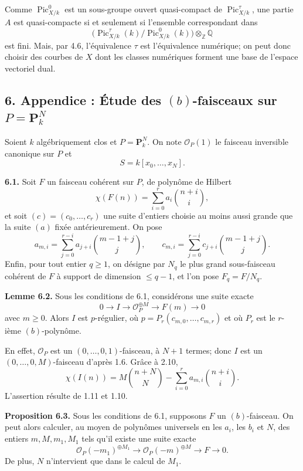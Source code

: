\documentclass[11pt]{article}
\providecommand{\Pic}{\operatorname{Pic}}
\providecommand{\Z}{\mathbb Z}
\providecommand{\Q}{\mathbb Q}
\begin{document}
Comme $\Pic^0_{X/k}$ est un sous-groupe ouvert quasi-compact de $\Pic^\tau_{X/k}$, une partie $A$ est quasi-compacte si et seulement si l'ensemble correspondant dans
\[
   \bigl(\Pic^\tau_{X/k}(k)/\Pic^0_{X/k}(k)\bigr)\otimes_{\Z}\Q
\]
est fini. Mais, par 4.6, l'\'equivalence $\tau$ est l'\'equivalence num\'erique; on peut donc choisir des courbes de $X$ dont les classes num\'eriques forment une base de l'espace vectoriel dual.

\subsection*{6. Appendice : Étude des $(b)$-faisceaux sur $P=\mathbf P^N_k$}

Soient $k$ alg\'ebriquement clos et $P=\mathbf P^N_k$. On note $\mathcal O_P(1)$ le faisceau inversible canonique sur $P$ et
\[
   S=k[x_0,\ldots,x_N].
\]

\textbf{6.1.} Soit $F$ un faisceau coh\'erent sur $P$, de polyn\^ome de Hilbert
\[
   \chi(F(n))=\sum_{i=0}^{r} a_i {n+i\choose i},
\]
et soit $(c)=(c_0,\ldots,c_r)$ une suite d'entiers choisie au moins aussi grande que la suite $(a)$ fix\'ee ant\'erieurement. On pose
\[
   a_{m,i}=\sum_{j=0}^{r-i}a_{j+i}{m-1+j\choose j},
   \qquad
   c_{m,i}=\sum_{j=0}^{r-i}c_{j+i}{m-1+j\choose j}.
\]
Enfin, pour tout entier $q\ge1$, on d\'esigne par $N_q$ le plus grand sous-faisceau coh\'erent de $F$ \`a support de dimension $\le q-1$, et l'on pose $F_q=F/N_q$.

\textbf{Lemme 6.2.} Sous les conditions de 6.1, consid\'erons une suite exacte
\[
   0\longrightarrow I\longrightarrow \mathcal O_P^{\oplus M}\longrightarrow F(m)\longrightarrow0
\]
avec $m\ge0$. Alors $I$ est $p$-r\'egulier, o\`u $p=P_r(c_{m,0},\ldots,c_{m,r})$ et o\`u $P_r$ est le $r$-i\`eme $(b)$-polyn\^ome.

En effet, $\mathcal O_P$ est un $(0,\ldots,0,1)$-faisceau, \`a $N+1$ termes; donc $I$ est un $(0,\ldots,0,M)$-faisceau d'apr\`es 1.6. Gr\^ace \`a 2.10,
\[
   \chi(I(n))=M{n+N\choose N}-\sum_{i=0}^{r} a_{m,i}{n+i\choose i}.
\]
L'assertion r\'esulte de 1.11 et 1.10.

\textbf{Proposition 6.3.} Sous les conditions de 6.1, supposons $F$ un $(b)$-faisceau. On peut alors calculer, au moyen de polyn\^omes universels en les $a_i$, les $b_i$ et $N$, des entiers $m,M,m_1,M_1$ tels qu'il existe une suite exacte
\[
   \mathcal O_P(-m_1)^{\oplus M_1}\longrightarrow \mathcal O_P(-m)^{\oplus M}\longrightarrow F\longrightarrow0.
\]
De plus, $N$ n'intervient que dans le calcul de $M_1$.
\end{document}
